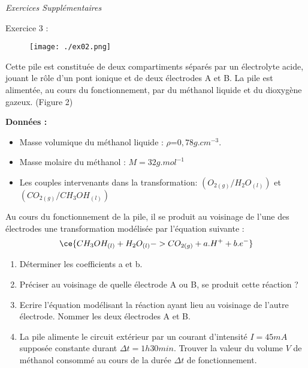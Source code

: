 \documentclass[12pt, french]{article}
\begin{document}
\vspace{-0.8cm}
\begin{center}
   \Large{ \em{Exercices Supplémentaires}}
\end{center}

\vspace{-0.8cm}

\begin{Box2}{Exercice 3 : }
\begin{wrapfigure}{r}{0.4\textwidth}
  \begin{center}
	\texttt{[image: ./ex02.png]}
  \end{center}
\end{wrapfigure}

Cette pile est constituée de deux
compartiments séparés par un
électrolyte acide, jouant le rôle
d’un pont ionique et de deux
électrodes A et B.
La pile est alimentée, au cours du
fonctionnement, par du méthanol
liquide et du dioxygène gazeux.
(Figure 2)

\textbf{Données :}
\begin{itemize}
	\item Masse volumique du méthanol liquide : $\rho$=$ 0,78 g.cm^{-3}$.
	\item Masse molaire du méthanol : $M = 32 g.mol^{-1}$ 
	\item Les couples intervenants dans la transformation: $(O_{2(g)}/H_2O_{(l)})$ et $(CO_{2(g)}/CH_3OH_{(l)})$
\end{itemize}

Au cours du fonctionnement de la pile, il se produit au voisinage de l’une des  électrodes une transformation modélisée par l’équation suivante : 
$$\ce{CH_3OH_{(l)} + H_2O_{(l)} ->  CO_{2(g)} + a.H^+ + b.e^- } $$

\begin{enumerate}
	\item Déterminer les coefficients a et b.
	\item Préciser au voisinage de quelle électrode A ou B, se produit cette réaction ?
	\item Ecrire l’équation modélisant la réaction ayant lieu au voisinage de l’autre
électrode. Nommer les deux électrodes A et B.
\item La pile alimente le circuit extérieur par un courant d’intensité $I = 45 mA$
supposée constante durant $\Delta{t} = 1 h 30 min$. Trouver la valeur du volume $V$
de méthanol consommé au cours de la durée $\Delta{t}$ de fonctionnement.
\end{enumerate}


\end{Box2}
\end{document}
